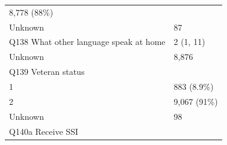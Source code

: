 \documentclass[]{article}
\begin{document}
\begin{longtable}[]{@{}ll@{}}
\begin{minipage}[t]{0.23\columnwidth}
8,778 (88\%)\strut
\end{minipage}\tabularnewline
\begin{minipage}[t]{0.71\columnwidth}\raggedright
Unknown\strut
\end{minipage} & \begin{minipage}[t]{0.23\columnwidth}\raggedright
87\strut
\end{minipage}\tabularnewline
\begin{minipage}[t]{0.71\columnwidth}\raggedright
Q138 What other language speak at home\strut
\end{minipage} & \begin{minipage}[t]{0.23\columnwidth}\raggedright
2 (1, 11)\strut
\end{minipage}\tabularnewline
\begin{minipage}[t]{0.71\columnwidth}\raggedright
Unknown\strut
\end{minipage} & \begin{minipage}[t]{0.23\columnwidth}\raggedright
8,876\strut
\end{minipage}\tabularnewline
\begin{minipage}[t]{0.71\columnwidth}\raggedright
Q139 Veteran status\strut
\end{minipage} & \begin{minipage}[t]{0.23\columnwidth}\raggedright
\strut
\end{minipage}\tabularnewline
\begin{minipage}[t]{0.71\columnwidth}\raggedright
1\strut
\end{minipage} & \begin{minipage}[t]{0.23\columnwidth}\raggedright
883 (8.9\%)\strut
\end{minipage}\tabularnewline
\begin{minipage}[t]{0.71\columnwidth}\raggedright
2\strut
\end{minipage} & \begin{minipage}[t]{0.23\columnwidth}\raggedright
9,067 (91\%)\strut
\end{minipage}\tabularnewline
\begin{minipage}[t]{0.71\columnwidth}\raggedright
Unknown\strut
\end{minipage} & \begin{minipage}[t]{0.23\columnwidth}\raggedright
98\strut
\end{minipage}\tabularnewline
\begin{minipage}[t]{0.71\columnwidth}\raggedright
Q140a Receive SSI\strut
\end{minipage} & \begin{minipage}[t]{0.23\columnwidth}\raggedright

\end{minipage}
\end{longtable}
\end{document}
